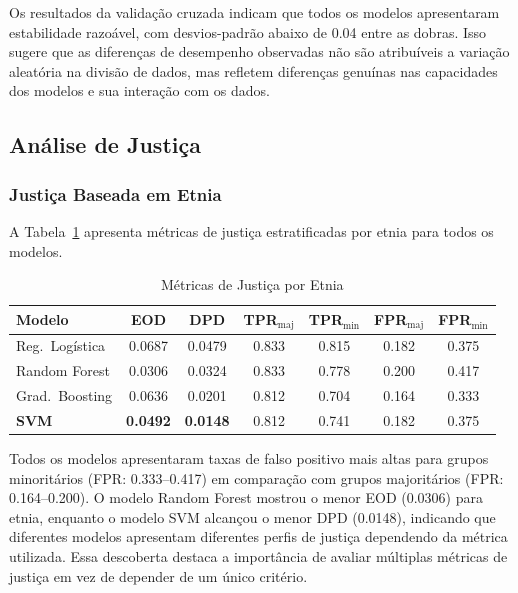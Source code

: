 Os resultados da validação cruzada indicam que todos os modelos apresentaram 
estabilidade razoável, com desvios-padrão abaixo de 0.04 entre as dobras. 
Isso sugere que as diferenças de desempenho observadas não são atribuíveis 
a variação aleatória na divisão de dados, mas refletem diferenças genuínas 
nas capacidades dos modelos e sua interação com os dados.

\subsection{Análise de Justiça}

\subsubsection{Justiça Baseada em Etnia}

A Tabela~\ref{tab:ethnicity_fairness} apresenta métricas de justiça 
estratificadas por etnia para todos os modelos.

\begin{table}[H]
\centering
\caption{Métricas de Justiça por Etnia}
\begin{tabular}{lcccccc}
\toprule
\textbf{Modelo} & \textbf{EOD} & \textbf{DPD} & 
\textbf{TPR$_{\text{maj}}$} & \textbf{TPR$_{\text{min}}$} & 
\textbf{FPR$_{\text{maj}}$} & \textbf{FPR$_{\text{min}}$} \\
\midrule
Reg.\ Logística & 0.0687 & 0.0479 & 0.833 & 0.815 & 0.182 & 0.375 \\
Random Forest & 0.0306 & 0.0324 & 0.833 & 0.778 & 0.200 & 0.417 \\
Grad.\ Boosting & 0.0636 & 0.0201 & 0.812 & 0.704 & 0.164 & 0.333 \\
\textbf{SVM} & \textbf{0.0492} & \textbf{0.0148} & 0.812 & 0.741 & 0.182 & 0.375 \\
\bottomrule
\end{tabular}
\label{tab:ethnicity_fairness}
\end{table}

Todos os modelos apresentaram taxas de falso positivo mais altas para 
grupos minoritários (FPR: 0.333--0.417) em comparação com grupos 
majoritários (FPR: 0.164--0.200). O modelo Random Forest mostrou o 
menor EOD (0.0306) para etnia, enquanto o modelo SVM alcançou o menor 
DPD (0.0148), indicando que diferentes modelos apresentam diferentes 
perfis de justiça dependendo da métrica utilizada. Essa descoberta 
destaca a importância de avaliar múltiplas métricas de justiça em vez 
de depender de um único critério.

